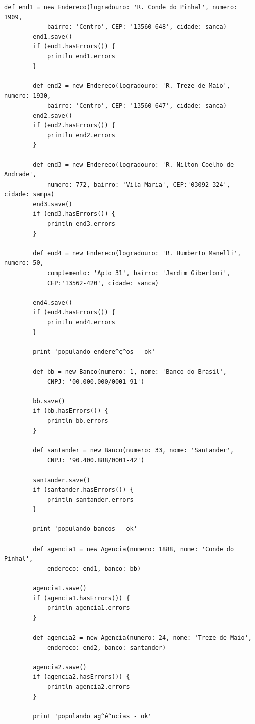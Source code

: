 \begin{lstlisting}[caption={\bf BootStrap.groovy (2)}, frame = trBL, float=htbp,
    label=codBootStrap2] 
        def end1 = new Endereco(logradouro: 'R. Conde do Pinhal', numero: 1909, 
            bairro: 'Centro', CEP: '13560-648', cidade: sanca)
        end1.save()
        if (end1.hasErrors()) {
            println end1.errors
        }
        
        def end2 = new Endereco(logradouro: 'R. Treze de Maio', numero: 1930, 
            bairro: 'Centro', CEP: '13560-647', cidade: sanca)
        end2.save()
        if (end2.hasErrors()) {
            println end2.errors
        }
        
        def end3 = new Endereco(logradouro: 'R. Nilton Coelho de Andrade',
            numero: 772, bairro: 'Vila Maria', CEP:'03092-324', cidade: sampa)        
        end3.save()
        if (end3.hasErrors()) {
            println end3.errors
        }
        
        def end4 = new Endereco(logradouro: 'R. Humberto Manelli', numero: 50, 
            complemento: 'Apto 31', bairro: 'Jardim Gibertoni', 
            CEP:'13562-420', cidade: sanca)
        
        end4.save()
        if (end4.hasErrors()) {
            println end4.errors
        }
        
        print 'populando endere^ç^os - ok'
        
        def bb = new Banco(numero: 1, nome: 'Banco do Brasil', 
            CNPJ: '00.000.000/0001-91')
        
        bb.save()
        if (bb.hasErrors()) {
            println bb.errors
        }
        
        def santander = new Banco(numero: 33, nome: 'Santander', 
            CNPJ: '90.400.888/0001-42')
        
        santander.save()
        if (santander.hasErrors()) {
            println santander.errors
        }

        print 'populando bancos - ok'
        
        def agencia1 = new Agencia(numero: 1888, nome: 'Conde do Pinhal', 
            endereco: end1, banco: bb)
        
        agencia1.save()
        if (agencia1.hasErrors()) {
            println agencia1.errors
        }
        
        def agencia2 = new Agencia(numero: 24, nome: 'Treze de Maio', 
            endereco: end2, banco: santander)
        
        agencia2.save()
        if (agencia2.hasErrors()) {
            println agencia2.errors
        }
        
        print 'populando ag^ê^ncias - ok'
\end{lstlisting}

